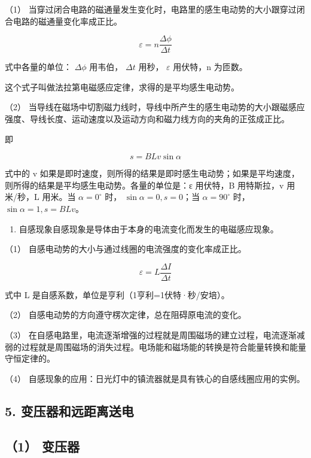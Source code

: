 （1）
当穿过闭合电路的磁通量发生变化时，电路里的感生电动势的大小跟穿过闭合电路的磁通量变化率成正比。

\[
\varepsilon = n \frac{\Delta \phi}{\Delta t}
\]

式中各量的单位： \(\Delta\phi\) 用韦伯， \(\Delta t\) 用秒，
\(\varepsilon\) 用伏特，n 为匝数。

这个式子叫做法拉第电磁感应定律，求得的是平均感生电动势。

（2）
当导线在磁场中切割磁力线时，导线中所产生的感生电动势的大小跟磁感应强度、导线长度、运动速度以及运动方向和磁力线方向的夹角的正弦成正比。

即

\[
s = B L v \sin \alpha
\]

式中的 v
如果是即时速度，则所得的结果是即时感生电动势；如果是平均速度，则所得的结果是平均感生电动势。各量的单位是：ε
用伏特，B 用特斯拉，v 用米/秒，L 用米。当 \(\alpha=0^{\circ}\) 时，
\(\sin\alpha=0, s=0\)；当 \(\alpha=90^{\circ}\) 时，
\(\sin\alpha=1, s=BLv\)。

\begin{enumerate}
\def\labelenumi{\arabic{enumi}.}
\setcounter{enumi}{3}
\tightlist
\item
  自感现象自感现象是导体由于本身的电流变化而发生的电磁感应现象。
\end{enumerate}

（1） 自感电动势的大小与通过线圈的电流强度的变化率成正比。

\[
\varepsilon = L \frac{\Delta I}{\Delta t}
\]

式中 L 是自感系数，单位是亨利（1亨利=1伏特·秒/安培）。

（2） 自感电动势的方向遵守楞次定律，总在阻碍原电流的变化。

（3）
在自感电路里，电流逐渐增强的过程就是周围磁场的建立过程，电流逐渐减弱的过程就是周围磁场的消失过程。电场能和磁场能的转换是符合能量转换和能量守恒定律的。

（4） 自感现象的应用：日光灯中的镇流器就是具有铁心的自感线圈应用的实例。

\subsection{5.
变压器和远距离送电}\label{ux53d8ux538bux5668ux548cux8fdcux8dddux79bbux9001ux7535}

\subsection{（1） 变压器}\label{ux53d8ux538bux5668-1}

